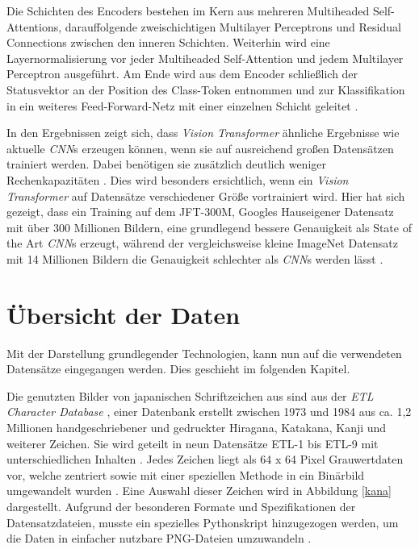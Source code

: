 \documentclass[twoside,a4paper]{IEEEtran}
\begin{document}
Die Schichten des Encoders bestehen im Kern aus mehreren Multiheaded Self-Attentions, darauffolgende zweischichtigen Multilayer Perceptrons und Residual Connections zwischen den inneren Schichten. Weiterhin wird eine Layernormalisierung vor jeder Multiheaded Self-Attention und jedem Multilayer Perceptron ausgeführt. Am Ende wird aus dem Encoder schließlich der Statusvektor an der Position des Class-Token entnommen und zur Klassifikation in ein weiteres Feed-Forward-Netz mit einer einzelnen Schicht geleitet \cite[S.3-4]{VIT}. 

In den Ergebnissen zeigt sich, dass \emph{Vision Transformer} ähnliche Ergebnisse wie aktuelle \emph{CNN}s erzeugen können, wenn sie auf ausreichend großen Datensätzen trainiert werden. Dabei benötigen sie zusätzlich deutlich weniger Rechenkapazitäten \cite[S.5]{VIT}. Dies wird besonders ersichtlich, wenn ein \emph{Vision Transformer} auf Datensätze verschiedener Größe vortrainiert wird. Hier hat sich gezeigt, dass ein Training auf dem JFT-300M, Googles Hauseigener Datensatz mit über 300 Millionen Bildern, eine grundlegend bessere Genauigkeit als State of the Art \emph{CNN}s erzeugt, während der vergleichsweise kleine ImageNet Datensatz mit 14 Millionen Bildern \cite{IMAGENET} die Genauigkeit schlechter als \emph{CNN}s werden lässt \cite{JFT}.
\section{Übersicht der Daten} %
Mit der Darstellung grundlegender Technologien, kann nun auf die verwendeten Datensätze eingegangen werden. Dies geschieht im folgenden Kapitel.

Die genutzten Bilder von japanischen Schriftzeichen aus \cite{RHC} sind aus der \emph{ETL Character Database} \cite[S.2-3]{RHC}, einer Datenbank erstellt zwischen 1973 und 1984 aus ca. 1,2 Millionen handgeschriebener und gedruckter Hiragana, Katakana, Kanji und weiterer Zeichen. Sie wird geteilt in neun Datensätze ETL-1 bis ETL-9 mit unterschiedlichen Inhalten \cite{ETL}. Jedes Zeichen liegt als 64 x 64 Pixel Grauwertdaten vor, welche zentriert sowie mit einer speziellen Methode in ein Binärbild umgewandelt wurden \cite[S.3]{RHC}. Eine Auswahl dieser Zeichen wird in Abbildung \ref{kana} dargestellt. Aufgrund der besonderen Formate und Spezifikationen der Datensatzdateien, musste ein spezielles Pythonskript hinzugezogen werden, um die Daten in einfacher nutzbare PNG-Dateien umzuwandeln \cite{ETL_FORMATS}.
 
\end{document}

